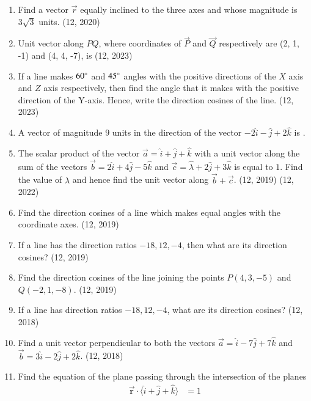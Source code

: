 \begin{enumerate}[label=\thesubsection.\arabic*,  ref=\thesubsection.\theenumi]
\item Find a vector $\overrightarrow{r}$ equally inclined to the three axes and whose magnitude is $3\sqrt{3}$ units.
\hfill (12,  2020)
    \item Unit vector along $PQ$,  where coordinates of $\vec{P}$ and $\vec{Q}$ respectively are (2, 1, -1) and (4, 4, -7),  is
    \hfill (12,  2023)
    \item If a line makes $60\degree$ and $45\degree$ angles with the positive directions of the $X$ axis and $Z$ axis respectively, then find the angle that it makes with the positive direction of the Y-axis. Hence, write the direction cosines of the line.
    \hfill (12, 2023)
    \item A vector of magnitude $9$ units in the direction of the vector $-2\hat{i} - \hat{j} + 2\hat{k}$ is \underline{\hspace{1cm}}.
	\item The scalar product of the vector $\overrightarrow{a} = \hat{i} + \hat{j} + \hat{k}$ with a unit vector along the sum of the vectors $\overrightarrow{b} = 2\hat{i} + 4\hat{j} - 5\hat{k}$ and $\overrightarrow{c} = \hat{\lambda} + 2\hat{j} + 3\hat{k}$ is equal to $1$. Find the value of $\lambda$ and hence find the unit vector along $\overrightarrow{b} + \overrightarrow{c}$. \hfill (12, 2019)
    \hfill (12, 2022)
	\item Find the direction cosines of a line which makes equal angles with the coordinate axes. \hfill (12, 2019)
	\item If a line has the direction ratios $-18, 12, -4$, then what are its direction cosines? \hfill (12, 2019)
	\item Find the direction cosines of the line joining the points $P(4, 3, -5)$ and $Q(-2, 1, -8)$. \hfill (12, 2019)
\item If a line has direction ratios $-18, 12, -4$, what are its direction cosines? \hfill (12, 2018)
\item Find a unit vector perpendicular to both the vectors $\overrightarrow{a} = \hat{i} - 7\hat{j} + 7\hat{k}$ and $\overrightarrow{b} = 3\hat{i} - 2\hat{j} + 2\hat{k}$. \hfill (12, 2018)
\item Find the equation of the plane passing through the intersection of the planes 
\begin{align*}
\overrightarrow{\mathbf{r}} \cdot \langle \hat{i} + \hat{j} + \hat{k} \rangle &= 1
\end{align*}

\end{enumerate}
